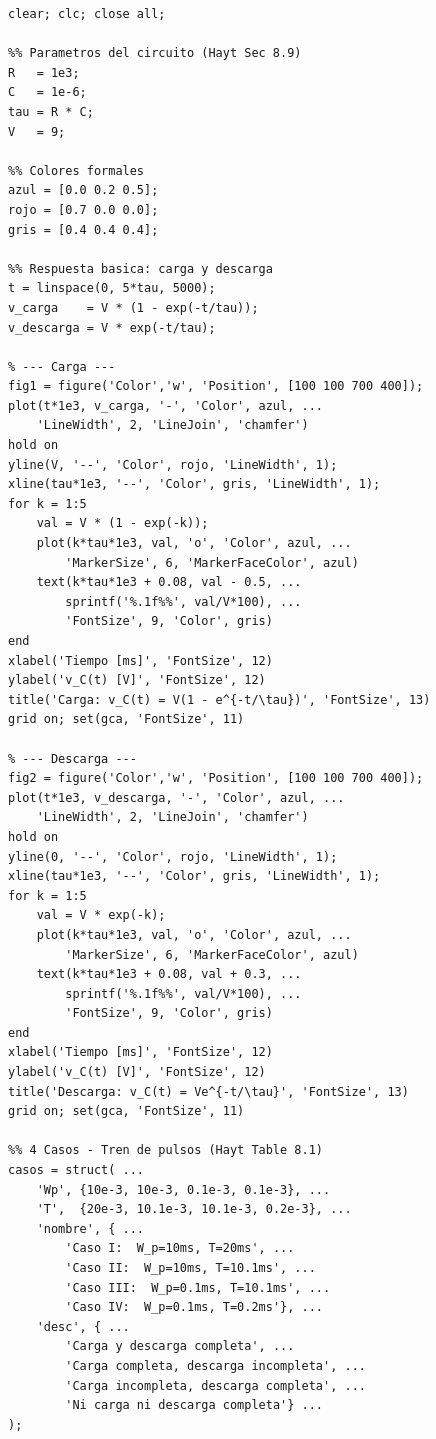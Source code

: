 \documentclass[12pt,a4paper]{article}
\begin{document}
\begin{lstlisting}[style=matlab, caption={C\'odigo completo de simulaci\'on del circuito RC.}]
clear; clc; close all;

%% Parametros del circuito (Hayt Sec 8.9)
R   = 1e3;
C   = 1e-6;
tau = R * C;
V   = 9;

%% Colores formales
azul = [0.0 0.2 0.5];
rojo = [0.7 0.0 0.0];
gris = [0.4 0.4 0.4];

%% Respuesta basica: carga y descarga
t = linspace(0, 5*tau, 5000);
v_carga    = V * (1 - exp(-t/tau));
v_descarga = V * exp(-t/tau);

% --- Carga ---
fig1 = figure('Color','w', 'Position', [100 100 700 400]);
plot(t*1e3, v_carga, '-', 'Color', azul, ...
    'LineWidth', 2, 'LineJoin', 'chamfer')
hold on
yline(V, '--', 'Color', rojo, 'LineWidth', 1);
xline(tau*1e3, '--', 'Color', gris, 'LineWidth', 1);
for k = 1:5
    val = V * (1 - exp(-k));
    plot(k*tau*1e3, val, 'o', 'Color', azul, ...
        'MarkerSize', 6, 'MarkerFaceColor', azul)
    text(k*tau*1e3 + 0.08, val - 0.5, ...
        sprintf('%.1f%%', val/V*100), ...
        'FontSize', 9, 'Color', gris)
end
xlabel('Tiempo [ms]', 'FontSize', 12)
ylabel('v_C(t) [V]', 'FontSize', 12)
title('Carga: v_C(t) = V(1 - e^{-t/\tau})', 'FontSize', 13)
grid on; set(gca, 'FontSize', 11)

% --- Descarga ---
fig2 = figure('Color','w', 'Position', [100 100 700 400]);
plot(t*1e3, v_descarga, '-', 'Color', azul, ...
    'LineWidth', 2, 'LineJoin', 'chamfer')
hold on
yline(0, '--', 'Color', rojo, 'LineWidth', 1);
xline(tau*1e3, '--', 'Color', gris, 'LineWidth', 1);
for k = 1:5
    val = V * exp(-k);
    plot(k*tau*1e3, val, 'o', 'Color', azul, ...
        'MarkerSize', 6, 'MarkerFaceColor', azul)
    text(k*tau*1e3 + 0.08, val + 0.3, ...
        sprintf('%.1f%%', val/V*100), ...
        'FontSize', 9, 'Color', gris)
end
xlabel('Tiempo [ms]', 'FontSize', 12)
ylabel('v_C(t) [V]', 'FontSize', 12)
title('Descarga: v_C(t) = Ve^{-t/\tau}', 'FontSize', 13)
grid on; set(gca, 'FontSize', 11)

%% 4 Casos - Tren de pulsos (Hayt Table 8.1)
casos = struct( ...
    'Wp', {10e-3, 10e-3, 0.1e-3, 0.1e-3}, ...
    'T',  {20e-3, 10.1e-3, 10.1e-3, 0.2e-3}, ...
    'nombre', { ...
        'Caso I:  W_p=10ms, T=20ms', ...
        'Caso II:  W_p=10ms, T=10.1ms', ...
        'Caso III:  W_p=0.1ms, T=10.1ms', ...
        'Caso IV:  W_p=0.1ms, T=0.2ms'}, ...
    'desc', { ...
        'Carga y descarga completa', ...
        'Carga completa, descarga incompleta', ...
        'Carga incompleta, descarga completa', ...
        'Ni carga ni descarga completa'} ...
);


\end{lstlisting}
\end{document}
